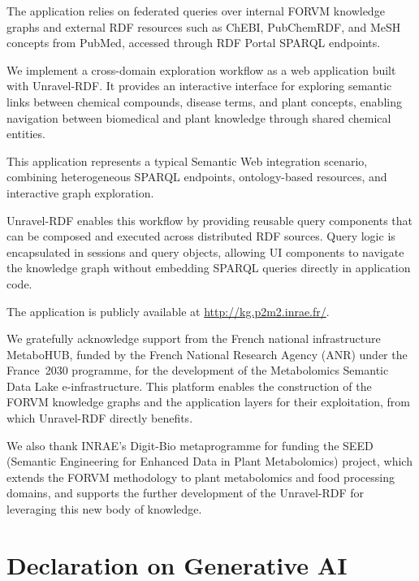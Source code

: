 \documentclass[
]{ceurart}
\begin{document}
The application relies on federated queries over internal FORVM
knowledge graphs and external RDF resources such as ChEBI, PubChemRDF,
and MeSH concepts from PubMed, accessed through RDF Portal SPARQL
endpoints\citep{kawashima_nbdc_2018,de_matos_chebi_2010,%
fu_pubchemrdf_2015,coletti_medical_2001}.

We implement a cross-domain exploration workflow as a web application
built with Unravel-RDF. It provides an interactive interface for
exploring semantic links between chemical compounds, disease terms,
and plant concepts, enabling navigation between biomedical and plant
knowledge through shared chemical entities.

This application represents a typical Semantic Web integration
scenario, combining heterogeneous SPARQL endpoints, ontology-based
resources, and interactive graph exploration.

Unravel-RDF enables this workflow by providing reusable query
components that can be composed and executed across distributed RDF
sources. Query logic is encapsulated in sessions and query objects,
allowing UI components to navigate the knowledge graph without
embedding SPARQL queries directly in application code.

The application is publicly available at
\url{http://kg.p2m2.inrae.fr/}.

\begin{acknowledgments}
We gratefully acknowledge support from the French national infrastructure 
MetaboHUB, funded by the French National Research Agency (ANR) under the 
France~2030 programme, for the development of the Metabolomics Semantic 
Data Lake e-infrastructure\cite{laisney_metabolomic_2024}. This platform 
enables the construction of the FORVM knowledge graphs and the application 
layers for their exploitation, from which Unravel-RDF directly benefits.

We also thank INRAE’s Digit-Bio metaprogramme for funding the SEED (Semantic 
Engineering for Enhanced Data in Plant Metabolomics) project, which 
extends the FORVM methodology to plant metabolomics and food processing 
domains, and supports the further development of the Unravel-RDF 
for leveraging this new body of knowledge.
\end{acknowledgments}

\section*{Declaration on Generative AI}
\end{document}
